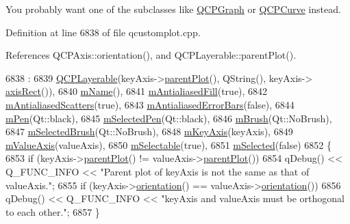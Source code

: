You probably want one of the subclasses like \hyperlink{class_q_c_p_graph}{Q\+C\+P\+Graph} or \hyperlink{class_q_c_p_curve}{Q\+C\+P\+Curve} instead. 

Definition at line 6838 of file qcustomplot.\+cpp.



References Q\+C\+P\+Axis\+::orientation(), and Q\+C\+P\+Layerable\+::parent\+Plot().


\begin{DoxyCode}
6838                                                                                :
6839   \hyperlink{class_q_c_p_layerable_a74c0fa237f29bf0e49565013fc5d1ec0}{QCPLayerable}(keyAxis->\hyperlink{class_q_c_p_layerable_ab7e0e94461566093d36ffc0f5312b109}{parentPlot}(), QString(), keyAxis->
      \hyperlink{class_q_c_p_axis_aada3102af43b029e3879bcbf2bddfabb}{axisRect}()),
6840   \hyperlink{class_q_c_p_abstract_plottable_ac29ffef424e2488675930de18cde612a}{mName}(),
6841   \hyperlink{class_q_c_p_abstract_plottable_a152ac765bedf927fb240545d11d453ea}{mAntialiasedFill}(\textcolor{keyword}{true}),
6842   \hyperlink{class_q_c_p_abstract_plottable_aa115755e525a8e3a86dc683f9cab755b}{mAntialiasedScatters}(\textcolor{keyword}{true}),
6843   \hyperlink{class_q_c_p_abstract_plottable_ad48660b2bd301576e92fb033d8f455ea}{mAntialiasedErrorBars}(\textcolor{keyword}{false}),
6844   \hyperlink{class_q_c_p_abstract_plottable_a67bc0622fd1b9fa14e54c14922dcec66}{mPen}(Qt::black),
6845   \hyperlink{class_q_c_p_abstract_plottable_a10619472f5d5e10e9519a599f1cf5576}{mSelectedPen}(Qt::black),
6846   \hyperlink{class_q_c_p_abstract_plottable_a33f00674c0161c13315ab9da0895418e}{mBrush}(Qt::NoBrush),
6847   \hyperlink{class_q_c_p_abstract_plottable_aea3c0da30c7a8be23ad5f2d9bca36762}{mSelectedBrush}(Qt::NoBrush),
6848   \hyperlink{class_q_c_p_abstract_plottable_a426f42e254d0f8ce5436a868c61a6827}{mKeyAxis}(keyAxis),
6849   \hyperlink{class_q_c_p_abstract_plottable_a2901452ca4aea911a1827717934a4bda}{mValueAxis}(valueAxis),
6850   \hyperlink{class_q_c_p_abstract_plottable_aceee52342c8e75727abcbd164986fdcb}{mSelectable}(\textcolor{keyword}{true}),
6851   \hyperlink{class_q_c_p_abstract_plottable_a43f68a0603e9bcd016bdfa6d9d5c41c9}{mSelected}(\textcolor{keyword}{false})
6852 \{
6853   \textcolor{keywordflow}{if} (keyAxis->\hyperlink{class_q_c_p_layerable_ab7e0e94461566093d36ffc0f5312b109}{parentPlot}() != valueAxis->\hyperlink{class_q_c_p_layerable_ab7e0e94461566093d36ffc0f5312b109}{parentPlot}())
6854     qDebug() << Q\_FUNC\_INFO << \textcolor{stringliteral}{"Parent plot of keyAxis is not the same as that of valueAxis."};
6855   \textcolor{keywordflow}{if} (keyAxis->\hyperlink{class_q_c_p_axis_a57483f2f60145ddc9e63f3af53959265}{orientation}() == valueAxis->\hyperlink{class_q_c_p_axis_a57483f2f60145ddc9e63f3af53959265}{orientation}())
6856     qDebug() << Q\_FUNC\_INFO << \textcolor{stringliteral}{"keyAxis and valueAxis must be orthogonal to each other."};
6857 \}
\end{DoxyCode}


